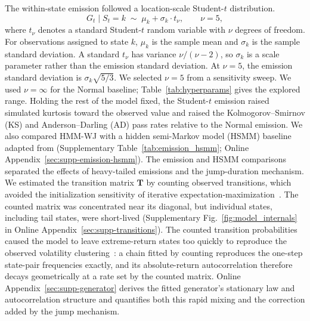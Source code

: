The within-state emission followed a location-scale Student-$t$
distribution.
\begin{equation}
    G_t \mid S_t = k \;\sim\; \mu_k + \sigma_k \cdot t_{\nu},
    \qquad \nu = 5,
    \label{eq:emission}
\end{equation}
where $t_\nu$ denotes a standard Student-$t$ random variable with
$\nu$ degrees of freedom. For observations assigned to state $k$,
$\mu_k$ is the sample mean and $\sigma_k$ is the sample standard
deviation. A standard $t_\nu$ has variance $\nu/(\nu-2)$, so
$\sigma_k$ is a scale parameter rather than the emission standard
deviation. At $\nu=5$, the emission standard deviation is
$\sigma_k\sqrt{5/3}$. We selected $\nu = 5$ from a sensitivity sweep.
We used $\nu = \infty$ for the Normal baseline; Table~\ref{tab:hyperparams}
gives the explored range. Holding the rest of the model fixed, the
Student-$t$ emission raised simulated kurtosis toward the observed
value and raised the Kolmogorov--Smirnov (KS) and Anderson--Darling
(AD) pass rates relative to the Normal emission. We also
compared HMM-WJ with a hidden semi-Markov model (HSMM) baseline
adapted from \citet{bullaBulla2006}
(Supplementary Table~\ref{tab:emission_hsmm}; Online
Appendix~\ref{sec:supp-emission-hsmm}). The emission and HSMM
comparisons separated the effects of heavy-tailed emissions and the
jump-duration mechanism. We estimated the transition matrix $\mathbf{T}$
by counting observed transitions, which avoided the initialization
sensitivity of iterative
expectation-maximization~\cite{bilmes1998}. The counted matrix was
concentrated near its diagonal, but individual states, including tail
states, were short-lived
(Supplementary Fig.~\ref{fig:model_internals} in Online
Appendix~\ref{sec:supp-transitions}). The counted transition
probabilities caused the model to leave extreme-return states too
quickly to reproduce the observed
volatility clustering~\cite{bullaBulla2006}: a chain fitted by
counting reproduces the one-step state-pair frequencies exactly, and
its absolute-return autocorrelation therefore decays geometrically at
a rate set by the counted matrix. Online
Appendix~\ref{sec:supp-generator} derives the fitted generator's
stationary law and autocorrelation structure and quantifies both this
rapid mixing and the correction added by the jump mechanism.

